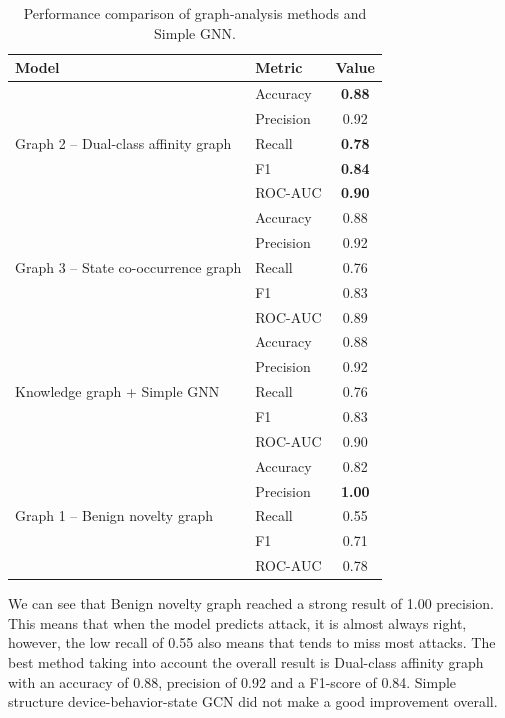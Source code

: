 \documentclass[final,5p,times,twocolumn]{elsarticle}
\begin{document}
\begin{table}[H]
\caption{Performance comparison of graph-analysis methods and Simple GNN.}
\centering
\scriptsize
\renewcommand{\arraystretch}{1.15}
\begin{tabular}{llc}
\toprule
\textbf{Model} & \textbf{Metric} & \textbf{Value} \\
\midrule

\multirow{5}{*}{Graph 2 -- Dual-class affinity graph}
& Accuracy & \textbf{0.88} \\
& Precision & 0.92 \\
& Recall & \textbf{0.78} \\
& F1 & \textbf{0.84} \\
& ROC-AUC & \textbf{0.90} \\
\midrule

\multirow{5}{*}{Graph 3 -- State co-occurrence graph}
& Accuracy & 0.88 \\
& Precision & 0.92 \\
& Recall & 0.76 \\
& F1 & 0.83 \\
& ROC-AUC & 0.89 \\
\midrule

\multirow{5}{*}{Knowledge graph + Simple GNN}
& Accuracy & 0.88 \\
& Precision & 0.92 \\
& Recall & 0.76 \\
& F1 & 0.83 \\
& ROC-AUC & 0.90 \\
\midrule

\multirow{5}{*}{Graph 1 -- Benign novelty graph}
& Accuracy & 0.82 \\
& Precision & \textbf{1.00} \\
& Recall & 0.55 \\
& F1 & 0.71 \\
& ROC-AUC & 0.78 \\
\bottomrule

\end{tabular}
\label{tab:graph_analysis_gnn_performance_vertical}
\end{table}

We can see that Benign novelty graph reached a strong result of 1.00 precision. This means that when the model predicts attack, it is almost always right, however, the low recall of 0.55 also means that tends to miss most attacks. The best method taking into account the overall result is Dual-class affinity graph with an accuracy of 0.88, precision of 0.92 and a F1-score of 0.84. Simple structure device-behavior-state GCN did not make a good improvement overall.
\endgroup
\end{document}
